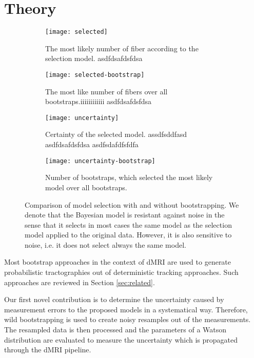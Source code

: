 \section{Theory}
\label{sec:bootstrap-consensus}
\begin{figure*}[t]
	\centering
	\begin{subfigure}[b]{0.24\linewidth}
		\texttt{[image: selected]}
		\caption{The most likely number of fiber according to the
		selection model. {\color{white}asdfdsafdsfdsa}}
		\label{fig:selected-uncertainty:rank-original}
	\end{subfigure}
	\begin{subfigure}[b]{0.24\linewidth}
		\texttt{[image: selected-bootstrap]}
		\caption{The most like number of fibers over all
		bootstraps.{\color{white}iiiiiiiiiiii asdfdsafdsfdsa}}
		\label{fig:selected-uncertainty:rank}
\end{subfigure}  
	\begin{subfigure}[b]{0.24\linewidth}
		\texttt{[image: uncertainty]}
		\caption{Certainty of the selected model.
		{\color{white}assdfsddfasd asdfdsafdsfdsa asdfsdafdfsfdfa}}
		
		\label{fig:selected-uncertainty:unc-original}
	\end{subfigure}
	\begin{subfigure}[b]{0.24\linewidth}
		\texttt{[image: uncertainty-bootstrap]}
		\caption{Number of bootstraps, which selected the most likely
		model over all bootstraps.}
		\label{fig:selected-uncertainty:unc}
	\end{subfigure}
	\caption{Comparison of model selection with and without bootstrapping.
	We denote that the Bayesian model is resistant against noise in the
sense that it selects in most cases the same model as the selection model
applied to the original data. However, it is also sensitive to noise, i.e. it
does not select always the same model.}
	\label{fig:selected-uncertainty}
\end{figure*}

Most bootstrap approaches in the context of dMRI are used  to generate
probabilistic tractographies out of deterministic tracking approaches. Such
approaches are reviewed in Section \ref{sec:related}. 

Our first novel contribution is to determine the uncertainty caused by
measurement errors to the proposed models in a systematical way. Therefore, wild bootstrapping is used to create
noisy resamples out of the measurements. The resampled data is then processed
and the parameters of a Watson distribution are evaluated to measure the
uncertainty which is propagated through the dMRI pipeline. 

